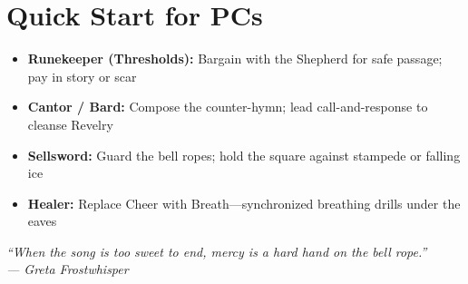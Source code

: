 \documentclass[11pt]{article}
\begin{document}
\section*{Quick Start for PCs}

\begin{itemize}
    \item \textbf{Runekeeper (Thresholds):} Bargain with the Shepherd for safe passage; pay in story or scar
    \item \textbf{Cantor / Bard:} Compose the counter-hymn; lead call-and-response to cleanse Revelry
    \item \textbf{Sellsword:} Guard the bell ropes; hold the square against stampede or falling ice
    \item \textbf{Healer:} Replace Cheer with Breath---synchronized breathing drills under the eaves
\end{itemize}

\begin{center}
    \textit{``When the song is too sweet to end, mercy is a hard hand on the bell rope.''} \\
    \textit{--- Greta Frostwhisper}
\end{center}


\end{document}
